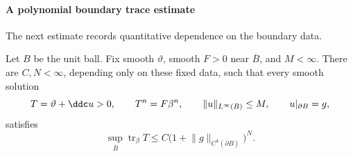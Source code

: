 \paragraph{A polynomial boundary trace estimate}

The next estimate records quantitative dependence on the boundary data.

\begin{proposition}\label{prop:interior-global-trace}
Let $B$ be the unit ball. Fix smooth $\vartheta$, smooth $F>0$ near $\overline B$, and $M<\infty$. There are $C,N<\infty$, depending only on these fixed data, such that every smooth solution
\[
  T=\vartheta+\ddc u>0,
  \qquad T^n=F\beta^n,
  \qquad \lVert u\rVert_{L^\infty(B)}\leq M,
  \qquad u|_{\partial B}=g,
\]
satisfies
\begin{equation}\label{eq:interior-polynomial-global-trace}
  \sup_{\overline B}\operatorname{tr}_\beta T
  \leq C\bigl(1+\lVert g\rVert_{C^4(\partial B)}\bigr)^N.
\end{equation}
\end{proposition}

